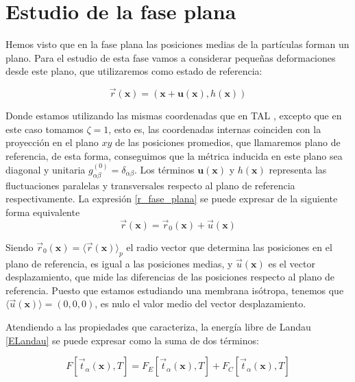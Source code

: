 \section{Estudio de la fase plana}

Hemos visto que en la fase plana las posiciones medias de la partículas forman
un plano. Para el estudio de esta fase vamos a considerar pequeñas
deformaciones desde este plano, que utilizaremos como estado de referencia:

\begin{equation}\label{r_fase_plana}
\vec{r}(\mathbf{x})=(\mathbf{x}+\mathbf{u(\mathbf{x})},h(\mathbf{x}))
\end{equation}

Donde estamos utilizando las mismas coordenadas que en TAL , excepto que en
este caso tomamos $\zeta=1$, esto es, las coordenadas internas coinciden con
la proyección en el plano $xy$ de las posiciones promedios, que llamaremos
plano de referencia, de esta forma, conseguimos que la métrica inducida en
este plano sea diagonal y unitaria
$g^{(0)}_{\alpha\beta}=\delta_{\alpha\beta}$. Los términos
$\mathbf{u(\mathbf{x})}$ y $h(\mathbf{x})$ 
representa las fluctuaciones paralelas y transversales respecto al plano de
referencia respectivamente. La expresión \eqref{r_fase_plana} se puede
expresar de la siguiente forma equivalente
\begin{equation}\label{deformacion}
\vec{r}(\mathbf{x})=\vec{r}_0(\mathbf{x})+\vec{u}(\mathbf{x})
\end{equation}

Siendo $\vec{r}_0(\mathbf{x})=\langle\vec{r}(\mathbf{x}) \rangle_p$ el radio
vector que determina las posiciones en el plano de referencia, es igual a las
posiciones medias, y $\vec{u}(\mathbf{x})$ es el vector desplazamiento, que
mide las diferencias de las posiciones respecto al plano de referencia. Puesto
que estamos estudiando una membrana isótropa, tenemos que
$\langle\vec{u}(\mathbf{x}) \rangle=(0,0,0)$, es nulo el valor medio del
vector desplazamiento.

Atendiendo a las propiedades que caracteriza, la energía libre de Landau
\eqref{ELandau} se puede expresar como la suma de dos términos:

\begin{equation}
 F[\vec{t}_{\alpha}(\mathbf{x}),T]= F_E[\vec{t}_{\alpha}(\mathbf{x}),T]+F_C[\vec{t}_{\alpha}(\mathbf{x}),T]
\end{equation}


